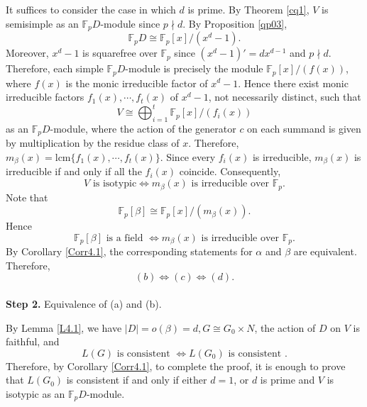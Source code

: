 \documentclass[12pt]{article}
\begin{document}
It suffices to consider the case in which $d$ is prime. 
By Theorem \ref{cq1}, $V$ is semisimple as an $\mathbb{F}_pD$-module since $p\nmid d$. By Proposition \ref{qp03}, 
\begin{equation*}
\mathbb{F}_pD\cong \mathbb{F}_p[x]/(x^d -1).    
\end{equation*}
Moreover, $x^d-1$ is squarefree over $\mathbb{F}_p$ since $(x^d-1)'=dx^{d-1}$ and $p\nmid d$.
Therefore, each simple $\mathbb{F}_pD$-module is precisely the module $\mathbb{F}_p[x]/(f(x))$, where $f(x)$ is 
the monic irreducible factor of $x^d-1$.
Hence there exist monic irreducible factors $f_1(x),\cdots,f_t(x)$ of $x^d-1$, not necessarily distinct, such that
$$V\cong\bigoplus_{i=1}^{t} \mathbb{F}_p[x]/(f_i(x))$$
as an $\mathbb{F}_pD$-module, where the action of the generator $c$ on 
each summand is given by multiplication by the residue class of $x$.
Therefore, $m_\beta(x)=\mbox{lcm}\{f_1(x),\cdots,f_t(x)\}$.
Since every $f_i(x)$ is irreducible, $m_\beta(x)$ is irreducible if and only if all the $f_i(x)$ coincide. 
Consequently, 
\begin{equation*}
V\mbox{ is isotypic}
\Longleftrightarrow m_\beta(x)\mbox{ is irreducible over } \mathbb{F}_p.
\end{equation*}
Note that $$\mathbb{F}_p[\beta]\cong \mathbb{F}_p[x]/(m_\beta(x)).$$
Hence $$\mathbb{F}_p[\beta]\mbox{ is a field }
\Longleftrightarrow
m_\beta(x)\mbox{ is irreducible over }\mathbb{F}_p.$$
By Corollary \ref{Corr4.1}, the corresponding statements for $\alpha$ and
$\beta$ are equivalent. Therefore, $$(b)\Longleftrightarrow(c)\Longleftrightarrow(d).$$\\
\textbf{Step 2.} Equivalence of (a) and (b).

By Lemma \ref{L4.1}, we have $|D|=o(\beta)=d, G\cong G_0\times N$, the action of $D$ on $V$ is faithful, and 
$$L(G) \mbox{ is consistent } \Longleftrightarrow  L(G_0)\mbox{ is consistent }.$$
 Therefore, by Corollary \ref{Corr4.1}, to complete the proof, it is enough to prove that 
$L(G_0)$ is consistent if and only if 
either $d=1$, or $d$ is prime and $V$  is isotypic as 
an $\mathbb{F}_pD$-module. 
\end{document}
